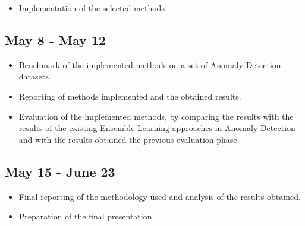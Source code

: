 \begin{itemize}
	\item Implementation of the selected methods.
\end{itemize}

\subsection{May 8 - May 12}

\begin{itemize}
	\item Benchmark of the implemented methods on a set of Anomaly Detection datasets.
	\item Reporting of methods implemented and the obtained results.
	\item Evaluation of the implemented methods, by comparing the results with the results of the existing Ensemble Learning approaches in Anomaly Detection and with the results obtained the previous evaluation phase.
\end{itemize}

\subsection{May 15 - June 23}

\begin{itemize}
	\item Final reporting of the methodology used and analysis of the results obtained.
	\item Preparation of the final presentation.
\end{itemize}